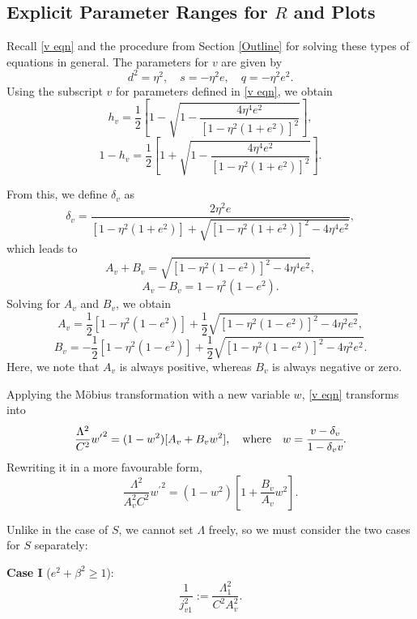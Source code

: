 \documentclass[12pt,oneside]{report}
\theoremstyle{definition}
\begin{document}
\subsection{Explicit Parameter Ranges for $R$ and Plots}

Recall \autoref{v eqn} and the procedure from Section \ref{Outline} for solving these types of equations in general. The parameters for $v$ are given by
$$ d^{2} = \eta^{2}, \quad s = -\eta^{2}e, \quad q = - \eta^{2}e^{2}.$$
Using the subscript $v$ for parameters defined in \autoref{v eqn}, we obtain
$$ h_{v} = \frac{1}{2} \left[ 1 - \sqrt{1 - \frac{4\eta^{4}e^{2}}{[1-\eta^{2}(1+e^{2})]^{2}}} \right],$$
$$ 1 -h_{v} = \frac{1}{2}\left[1 + \sqrt{1 - \frac{4\eta^{4}e^{2}}{[1-\eta^{2}(1+e^{2})]^{2}}}\right].$$

From this, we define $\delta_{v}$ as
$$ \delta_{v} = \frac{2\eta^{2}e}{[1-\eta^{2}(1+e^{2})]+\sqrt{[1-\eta^{2}(1+e^{2})]^{2}-4\eta^{4}e^{2}}},$$
which leads to
$$ A_{v}+B_{v} = \sqrt{[1-\eta^{2}(1-e^{2})]^{2}-4\eta^{4}e^{2}},$$
$$ A_{v} - B_{v} = 1 -\eta^{2}(1-e^{2}).$$
Solving for $A_{v}$ and $B_{v}$, we obtain
$$ A_{v} = \frac{1}{2}[1-\eta^{2}(1-e^{2})]+\frac{1}{2}\sqrt{[1-\eta^{2}(1-e^{2})]^{2}-4\eta^{2}e^{2}},$$
$$ B_{v} = -\frac{1}{2}[1-\eta^{2}(1-e^{2})] + \frac{1}{2} \sqrt{[1-\eta^{2}(1-e^{2})]^{2}-4\eta^{2}e^{2}}.$$
Here, we note that $A_{v}$ is always positive, whereas $B_{v}$ is always negative or zero.

Applying the M\"obius transformation with a new variable $w$, \autoref{v eqn} transforms into
\begin{equation}\label{eqn w}
    \frac{\Lambda^{2}}{C^{2}}{w^{\prime}}^{2} = (1-w^{2})[A_{v}+B_{v}w^{2}], \quad \text{where} \quad w = \cfrac{v-\delta_{v}}{1-\delta_{v}v}.
\end{equation}
Rewriting it in a more favourable form,
$$ \frac{\Lambda^{2}}{A_{v}^{2}C^{2}}{w^{\prime}}^{2} = (1-w^{2})\left[1+\frac{B_{v}}{A_{v}}w^{2}\right].$$

Unlike in the case of $S$, we cannot set $\Lambda$ freely, so we must consider the two cases for $S$ separately:

\textbf{Case I} ($e^{2}+\beta^{2} \geq 1$):
$$ \frac{1}{j_{v1}^{2}} := \frac{\Lambda_{1}^{2}}{C^{2}A_{v}^{2}}.$$
\end{document}
